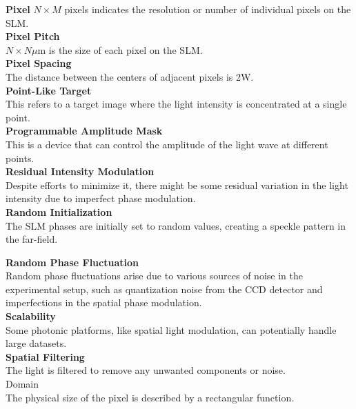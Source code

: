 \textbf{Pixel}
$N \times M$ pixels indicates the resolution or number of individual pixels on the SLM.\\

\textbf{Pixel Pitch} \\
 $N \times N \mu$m is the size of each pixel on the SLM.\\

\textbf{Pixel Spacing} \\ 
The distance between the centers of adjacent pixels is 2W. \\

\textbf{Point-Like Target} \\
This refers to a target image where the light intensity is concentrated at a single point. \\

\textbf{Programmable Amplitude Mask}\\
This is a device that can control the amplitude of the light wave at different points. \\

\textbf{Residual Intensity Modulation} \\
Despite efforts to minimize it, there might be some residual variation in the light intensity due to imperfect phase modulation.\\

\textbf{Random Initialization}\\
The SLM phases are initially set to random values, creating a speckle pattern in the far-field.

\textbf{Random Phase Fluctuation} \\
Random phase fluctuations arise due to various sources of noise in the experimental setup, such as quantization noise from the CCD detector and imperfections in the spatial phase modulation. \\

\textbf{Scalability} \\
Some photonic platforms, like spatial light modulation, can potentially handle large datasets.\\

\textbf{Spatial Filtering}\\
The light is filtered to remove any unwanted components or noise.\\

\Spatial Domain \\
The physical size of the pixel is described by a rectangular function. \\

